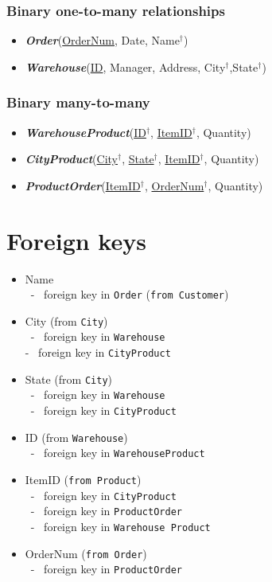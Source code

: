 \documentclass[letterpaper, 11pt]{article}
\newcommand{\1}{\mathds{1}}	%
\theoremstyle{definition}
\begin{document}
\subsubsection*{Binary one-to-many relationships}
\begin{itemize}
    \item[\ding{221}]\textit{\textbf{Order}}(\underline{OrderNum}, Date, Name$^\dag$)
    \item[\ding{221}] \textit{\textbf{Warehouse}}(\underline{ID}, Manager, Address, City$^\dag$,State$^\dag$)
\end{itemize}
\subsubsection*{Binary many-to-many}
\begin{itemize}
    \item[\ding{221}] \textit{\textbf{WarehouseProduct}}(\underline{ID$^\dag$}, \underline{ItemID$^\dag$}, Quantity)
    \item[\ding{221}] \textit{\textbf{CityProduct}}(\underline{City$^\dag$}, \underline{State$^\dag$}, \underline{ItemID$^\dag$}, Quantity)
    \item[\ding{221}] \textit{\textbf{ProductOrder}}(\underline{ItemID$^\dag$}, \underline{OrderNum$^\dag$}, Quantity)
\end{itemize}
\section{Foreign keys}
\begin{itemize}
    \item Name  \\
        \ - \ foreign key in \texttt{Order} (\texttt{from Customer})
    \item City (from \texttt{City})\\
         \ - \ foreign key in \texttt{Warehouse} \\
         - \ foreign key in \texttt{CityProduct} 
     \item State (from \texttt{City})\\ 
        \ - \ foreign key in \texttt{Warehouse} \\
        \ - \ foreign key in \texttt{CityProduct}
    \item ID (from \texttt{Warehouse}) \\
        \ - \ foreign key in \texttt{WarehouseProduct}
    \item ItemID (\texttt{from Product}) \\
        \ - \ foreign key in \texttt{CityProduct} \\
        \ - \ foreign key in \texttt{ProductOrder} \\
        \ - \ foreign key in \texttt{Warehouse Product}
    \item OrderNum (\texttt{from Order}) \\
        \ - \ foreign key in \texttt{ProductOrder}
\end{itemize}
\end{document}

